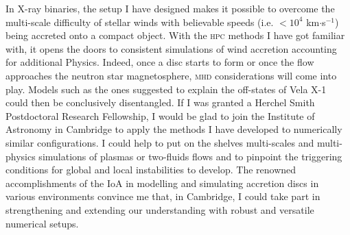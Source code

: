 \documentclass[a4paper,12pt,onecolumn]{article}
\begin{document}
\indent In X-ray binaries, the setup I have designed makes it possible to overcome the multi-scale difficulty of stellar winds with believable speeds (i.e. $<10^4$ km$\cdot$s$^{-1}$) being accreted onto a compact object. With the \textsc{hpc} methods I have got familiar with, it opens the doors to consistent simulations of wind accretion accounting for additional Physics. Indeed, once a disc starts to form or once the flow approaches the neutron star magnetosphere, \textsc{mhd} considerations will come into play. Models such as the ones suggested to explain the off-states of Vela X-1 could then be conclusively disentangled. If I was granted a Herchel Smith Postdoctoral Research Fellowship, I would be glad to join the Institute of Astronomy in Cambridge to apply the methods I have developed to numerically similar configurations. I could help to put on the shelves multi-scales and multi-physics simulations of plasmas or two-fluids flows and to pinpoint the triggering conditions for global and local instabilities to develop. The renowned accomplishments of the IoA in modelling and simulating accretion discs in various environments convince me that, in Cambridge, I could take part in strengthening and extending our understanding with robust and versatile numerical setups.

\newpage

\setlength{\bibsep}{5pt}
\small


\end{document}
